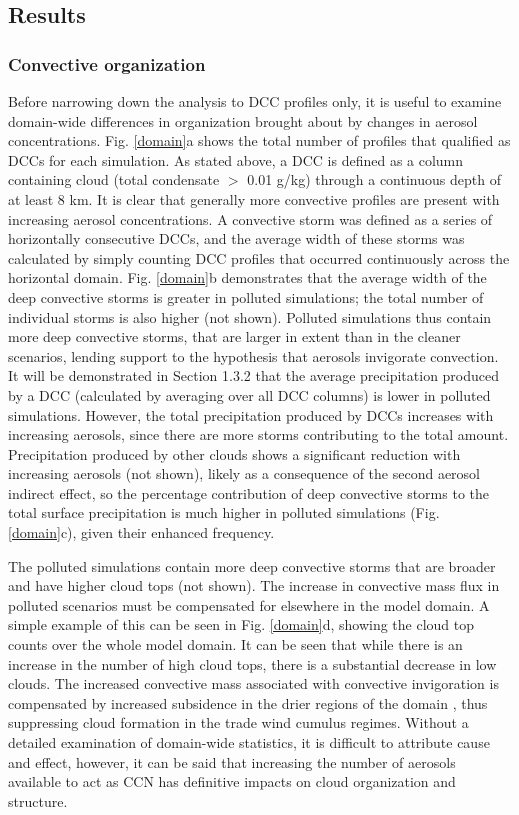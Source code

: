 \subsection{Results}

\subsubsection{Convective organization}

Before narrowing down the analysis to DCC profiles only, it is useful to examine domain-wide differences in organization brought about by changes in aerosol concentrations.  Fig. \ref{domain}a shows the total number of profiles that qualified as DCCs for each simulation.  As stated above, a DCC is defined as a column containing cloud (total condensate $>$ 0.01 g/kg) through a continuous depth of at least 8 km.  It is clear that generally more convective profiles are present with increasing aerosol concentrations.  A convective storm was defined as a series of horizontally consecutive DCCs, and the average width of these storms was calculated by simply counting DCC profiles that occurred continuously across the horizontal domain.  Fig. \ref{domain}b  demonstrates that the average width of the deep convective storms is greater in polluted simulations; the total number of individual storms is also higher (not shown).  Polluted simulations thus contain more deep convective storms, that are larger in extent than in the cleaner scenarios, lending support to the hypothesis that aerosols invigorate convection.  It will be demonstrated in Section 1.3.2 that the average precipitation produced by a DCC (calculated by averaging over all DCC columns) is lower in polluted simulations.  However, the total precipitation produced by DCCs increases with increasing aerosols, since there are more storms contributing to the total amount.  Precipitation produced by other clouds shows a significant reduction with increasing aerosols (not shown), likely as a consequence of the second aerosol indirect effect, so the percentage contribution of deep convective storms to the total surface precipitation is much higher in polluted simulations (Fig. \ref{domain}c), given their enhanced frequency.

The polluted simulations contain more deep convective storms that are broader and have higher cloud tops (not shown).  The increase in convective mass flux in polluted scenarios must be compensated for elsewhere in the model domain.  A simple example of this can be seen in Fig. \ref{domain}d, showing the cloud top counts over the whole model domain.  It can be seen that while there is an increase in the number of high cloud tops, there is a substantial decrease in low clouds.  The increased convective mass associated with convective invigoration is compensated by increased subsidence in the drier regions of the domain \citep{sue2012}, thus suppressing cloud formation in the trade wind cumulus regimes.  Without a detailed examination of domain-wide statistics, it is difficult to attribute cause and effect, however, it can be said that increasing the number of aerosols available to act as CCN has definitive impacts on cloud organization and structure.


